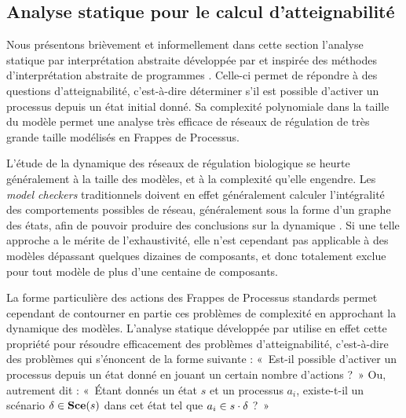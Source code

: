 


\subsection{Analyse statique pour le calcul d'atteignabilité}

Nous présentons brièvement et informellement dans cette section
l'analyse statique par interprétation abstraite
développée par 
et inspirée des méthodes d'interprétation abstraite de programmes \cite{Cousot77}.
Celle-ci permet de répondre à des questions d'atteignabilité,
c'est-à-dire déterminer s'il est possible d'activer un processus depuis un état initial donné.
Sa complexité polynomiale dans la taille du modèle
permet une analyse très efficace de réseaux de régulation de très grande taille
modélisés en Frappes de Processus.

\myskip

L'étude de la dynamique des réseaux de régulation biologique se heurte généralement
à la taille des modèles, et à la complexité qu'elle engendre.
Les \textit{model checkers} traditionnels doivent en effet généralement calculer
l'intégralité des comportements possibles de réseau,
généralement sous la forme d'un graphe des états,
afin de pouvoir produire des conclusions sur la dynamique \cite{Richard06}.
Si une telle approche a le mérite de l'exhaustivité,
elle n'est cependant pas applicable à des modèles dépassant quelques dizaines de composants,
et donc totalement exclue pour tout modèle de plus d'une centaine de composants.

La forme particulière des actions des Frappes de Processus standards
permet cependant de contourner en partie ces problèmes de complexité en approchant
la dynamique des modèles.
L'analyse statique développée par  utilise en effet
cette propriété pour résoudre efficacement des problèmes d'atteignabilité,
c'est-à-dire des problèmes qui s'énoncent de la forme suivante :
«~Est-il possible d'activer un processus depuis un état donné en jouant
un certain nombre d'actions ?~»
Ou, autrement dit :
«~Étant donnés un état $s$ et un processus $a_i$,
existe-t-il un scénario $\delta \in \mathbf{Sce}(s)$ dans cet état
tel que $a_i \in s \cdot \delta$ ?~»

